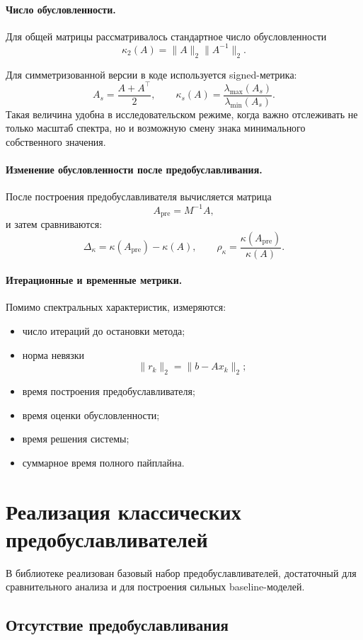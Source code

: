 \documentclass[12pt,a4paper]{article}
\begin{document}
\paragraph{Число обусловленности.}
Для общей матрицы рассматривалось стандартное число обусловленности
\[
\kappa_2(A)=\|A\|_2\|A^{-1}\|_2.
\]

Для симметризованной версии в коде используется signed-метрика:
\[
A_s=\frac{A+A^\top}{2}, \qquad
\kappa_s(A)=\frac{\lambda_{\max}(A_s)}{\lambda_{\min}(A_s)}.
\]
Такая величина удобна в исследовательском режиме, когда важно отслеживать не только масштаб спектра, но и возможную смену знака минимального собственного значения.

\paragraph{Изменение обусловленности после предобуславливания.}
После построения предобуславливателя вычисляется матрица
\[
A_{\text{pre}} = M^{-1}A,
\]
и затем сравниваются:
\[
\Delta_\kappa = \kappa(A_{\text{pre}})-\kappa(A),
\qquad
\rho_\kappa = \frac{\kappa(A_{\text{pre}})}{\kappa(A)}.
\]

\paragraph{Итерационные и временные метрики.}
Помимо спектральных характеристик, измеряются:
\begin{itemize}[leftmargin=*]
    \item число итераций до остановки метода;
    \item норма невязки
    \[
    \|r_k\|_2 = \|b-Ax_k\|_2;
    \]
    \item время построения предобуславливателя;
    \item время оценки обусловленности;
    \item время решения системы;
    \item суммарное время полного пайплайна.
\end{itemize}

\section{Реализация классических предобуславливателей}

В библиотеке реализован базовый набор предобуславливателей, достаточный для сравнительного анализа и для построения сильных baseline-моделей.

\subsection{Отсутствие предобуславливания}
\end{document}
